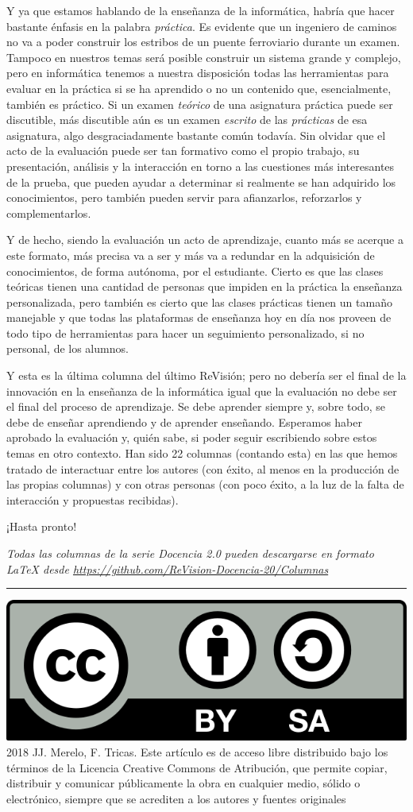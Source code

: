 \documentclass[twoside,10pt]{article}
\newcommand{\surl}[1]{{\small\url{#1}}}
\begin{document}
\begin{multicols}{2}
Y ya que estamos hablando de la enseñanza de la informática, habría
que hacer bastante énfasis en la palabra {\em práctica}. Es evidente
que un ingeniero de caminos no va a poder construir los estribos de un
puente ferroviario durante un examen. Tampoco en nuestros temas será posible construir un sistema grande y complejo, pero en informática tenemos a
nuestra disposición todas las herramientas para evaluar en la práctica
si se ha aprendido o no un contenido que, esencialmente, también es
práctico. 
Si un examen {\em teórico} de una asignatura práctica puede ser discutible, más
discutible aún es un examen {\em escrito} de las {\em prácticas} de esa
asignatura, algo desgraciadamente bastante común todavía.
Sin olvidar que el acto de la evaluación puede ser tan formativo como el propio trabajo, su
presentación, análisis y la interacción en torno a las cuestiones más
interesantes de la prueba, que pueden ayudar a determinar si realmente se han
adquirido los conocimientos, pero también pueden servir para afianzarlos,
reforzarlos y complementarlos.

Y de hecho, siendo la evaluación un acto de aprendizaje, cuanto más se
acerque a este formato, más precisa va a ser y más va a redundar en la
adquisición de conocimientos, de forma autónoma, por el
estudiante. Cierto es que las clases teóricas tienen una cantidad de
personas que impiden en la práctica la enseñanza personalizada, pero
también es cierto que las clases prácticas tienen un tamaño manejable
y que todas las plataformas de enseñanza hoy en día nos proveen de
todo tipo de herramientas para hacer un seguimiento personalizado, si
no personal, de los alumnos.

Y esta es la última columna del último ReVisión; pero no debería ser el
final de la innovación en la enseñanza de la informática igual que la
evaluación no debe ser el final del proceso de aprendizaje. Se debe
aprender siempre y, sobre todo, se debe de enseñar aprendiendo y de
aprender enseñando.
Esperamos haber aprobado la evaluación y, quién sabe, si poder seguir
escribiendo sobre estos temas en otro contexto. Han sido 22 columnas
(contando esta) en las que hemos tratado de interactuar entre los
autores (con éxito, al menos en la producción de las propias columnas)
y con otras personas (con poco éxito, a la luz de la falta de
interacción y propuestas recibidas).

¡Hasta pronto!

\noindent\emph{Todas las columnas de la serie Docencia 2.0
pueden descargarse en formato LaTeX desde
\surl{https://github.com/ReVision-Docencia-20/Columnas}}

\noindent\rule{90mm}{1pt}

{\small \noindent\includegraphics[height = 4ex]{../CC.png} 2018 JJ. Merelo, F. Tricas. Este artículo es de acceso libre distribuido bajo los términos
de la Licencia Creative Commons de Atribución, que permite copiar,
distribuir y comunicar públicamente la obra en cualquier medio, sólido
o electrónico, siempre que se acrediten a los autores y fuentes
originales}

\end{multicols}
\end{document}
